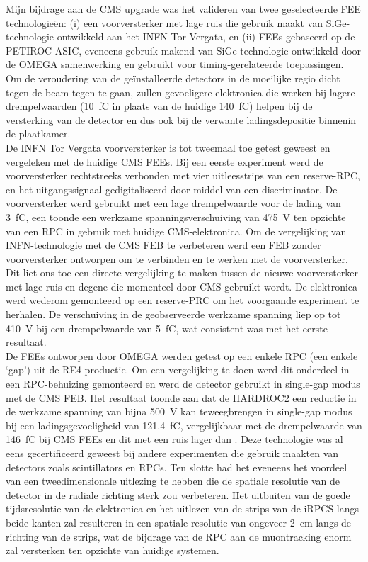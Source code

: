 	Mijn bijdrage aan de CMS upgrade was het valideren van twee geselecteerde FEE technologieën: (i) een voorversterker met lage ruis die gebruik maakt van SiGe-technologie ontwikkeld aan het INFN Tor Vergata, en (ii) FEEs gebaseerd op de PETIROC ASIC, eveneens gebruik makend van SiGe-technologie ontwikkeld door de OMEGA samenwerking en gebruikt voor timing-gerelateerde toepassingen. Om de veroudering van de geïnstalleerde detectors in de moeilijke regio dicht tegen de beam tegen te gaan, zullen gevoeligere elektronica die werken bij lagere drempelwaarden (\SI{10}{fC} in plaats van de huidige \SI{140}{fC}) helpen bij de versterking van de detector en dus ook bij de verwante ladingsdepositie binnenin de plaatkamer.\\
	De INFN Tor Vergata voorversterker is tot tweemaal toe getest geweest en vergeleken met de huidige CMS FEEs. Bij een eerste experiment werd de voorversterker rechtstreeks verbonden met vier uitleesstrips van een reserve-RPC, en het uitgangssignaal gedigitaliseerd door middel van een discriminator. De voorversterker werd gebruikt met een lage drempelwaarde voor de lading van \SI{3}{fC}, een toonde een werkzame spanningsverschuiving van \SI{475}{V} ten opzichte van een RPC in gebruik met huidige CMS-elektronica. Om de vergelijking van INFN-technologie met de CMS FEB te verbeteren werd een FEB zonder voorversterker ontworpen om te verbinden en te werken met de voorversterker. Dit liet ons toe een directe vergelijking te maken tussen de nieuwe voorversterker met lage ruis en degene die momenteel door CMS gebruikt wordt. De elektronica werd wederom gemonteerd op een reserve-PRC om het voorgaande experiment te herhalen. De verschuiving in de geobserveerde werkzame spanning liep op tot \SI{410}{V} bij een drempelwaarde van \SI{5}{fC}, wat consistent was met het eerste resultaat.\\
	De FEEs ontworpen door OMEGA werden getest op een enkele RPC (een enkele ‘gap’) uit de RE4-productie. Om een vergelijking te doen werd dit onderdeel in een RPC-behuizing gemonteerd en werd de detector gebruikt in single-gap modus met de CMS FEB. Het resultaat toonde aan dat de HARDROC2 een reductie in de werkzame spanning van bijna \SI{500}{V} kan teweegbrengen in single-gap modus bij een ladingsgevoeligheid van \SI{121.4}{fC}, vergelijkbaar met de drempelwaarde van \SI{146}{fC} bij CMS FEEs en dit met een ruis lager dan . Deze technologie was al eens gecertificeerd geweest bij andere experimenten die gebruik maakten van detectors zoals scintillators en RPCs. Ten slotte had het eveneens het voordeel van een tweedimensionale uitlezing te hebben die de spatiale resolutie van de detector in de radiale richting sterk zou verbeteren. Het uitbuiten van de goede tijdsresolutie van de elektronica en het uitlezen van de strips van de iRPCS langs beide kanten zal resulteren in een spatiale resolutie van ongeveer \SI{2}{cm} langs de richting van de strips, wat de bijdrage van de RPC aan de muontracking enorm zal versterken ten opzichte van huidige systemen.\\

